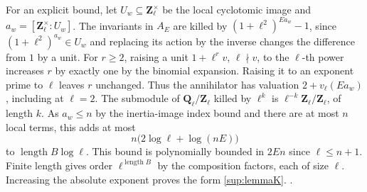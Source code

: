 For an explicit bound, let \(U_w\subseteq\mathbf Z_\ell^\times\) be the local cyclotomic image and \(a_w=[\mathbf Z_\ell^\times:U_w]\). The invariants in \(A_E\) are killed by \((1+\ell^2)^{Ea_w}-1\), since \((1+\ell^2)^{a_w}\in U_w\) and replacing its action by the inverse changes the difference from \(1\) by a unit. For \(r\ge2\), raising a unit \(1+\ell^r v\), \(\ell\nmid v\), to the \(\ell\)-th power increases \(r\) by exactly one by the binomial expansion. Raising it to an exponent prime to \(\ell\) leaves \(r\) unchanged. Thus the annihilator has valuation \(2+v_\ell(Ea_w)\), including at \(\ell=2\). The submodule of \(\mathbf Q_\ell/\mathbf Z_\ell\) killed by \(\ell^k\) is \(\ell^{-k}\mathbf Z_\ell/\mathbf Z_\ell\), of length \(k\). As \(a_w\le n\) by the inertia-image index bound and there are at most \(n\) local terms, this adds at most
\[
 n\bigl(2\log\ell+\log(nE)\bigr)
\]
to \(\operatorname{length}B\log\ell\). This bound is polynomially bounded in \(2En\) since \(\ell\le n+1\). Finite length gives order \(\ell^{\operatorname{length}B}\) by the composition factors, each of size \(\ell\). Increasing the absolute exponent proves the form \eqref{sup:lemmaK}. 
.

